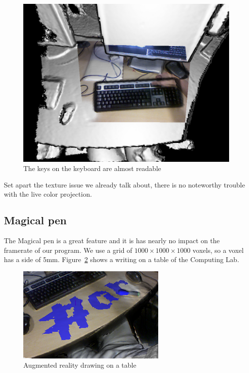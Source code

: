 \documentclass[12pt]{article}
\begin{document}
\begin{figure}[!h]
  \centering
  \includegraphics[scale=0.3]{Color2.png}
  \caption{\label{fig:color2} The keys on the keyboard are almost readable}
\end{figure}

Set apart the texture issue we already talk about, there is no noteworthy trouble with the live color projection.

\subsection{Magical pen}
The Magical pen is a great feature and it is has nearly no impact on the framerate of our program. We use a grid of $1000\times 1000\times 1000$ voxels, so a voxel has a side of 5mm. Figure~\ref{fig:hashtag} shows a writing on a table of the Computing Lab.

\begin{figure}[!h]
  \centering
  \includegraphics[scale=0.6]{hashtag.png}
  \caption{\label{fig:hashtag} Augmented reality drawing on a table}
\end{figure}
\end{document}
